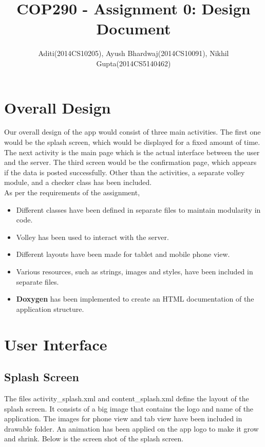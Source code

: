 \documentclass{article}
\begin{document}
\title{COP290 - Assignment 0: Design Document}
\author{ Aditi(2014CS10205), Ayush Bhardwaj(2014CS10091), Nikhil Gupta(2014CS5140462)}

\maketitle

\section{Overall Design}

Our overall design of the app would consist of three main activities. The first one would be the splash screen, which would be displayed for a fixed amount of time. The next activity is the main page which is the actual interface between the user and the server. The third screen would be the confirmation page, which appears if the data is posted successfully. Other than the activities, a separate volley module, and a checker class has been included.\\
As per the requirements of the assignment,
\begin{itemize}
\item Different classes have been defined in separate files to maintain modularity in code.
\item Volley has been used to interact with the server.
\item Different layouts have been made for tablet and mobile phone view.
\item Various resources, such as strings, images and styles, have been included in separate files.
\item \textbf{Doxygen} has been implemented to create an HTML documentation of the application structure.
\end{itemize} 

\section{User Interface}
\subsection{Splash Screen} The files activity\_splash.xml and content\_splash.xml define the layout of the splash screen. It consists of a big image that contains the logo and name of the application. The images for phone view and tab view have been included in drawable folder. An animation has been applied on the app logo to make it grow and shrink. Below is the screen shot of the splash screen.
\end{document}
